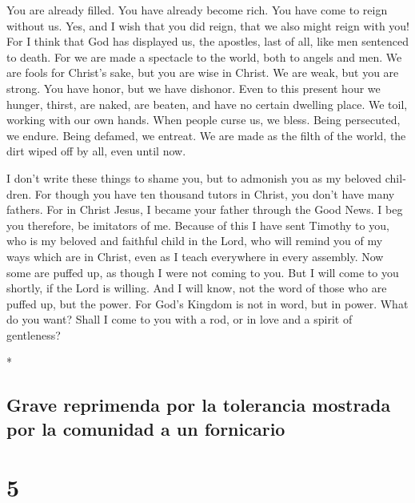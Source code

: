 \begin{paracol}{2}
\begin{otherlanguage}{english}
 You are already filled. You have already become rich. You
have come to reign without us. Yes, and I wish that you did reign, that
we also might reign with you!  For I think that God has
displayed us, the apostles, last of all, like men sentenced to death.
For we are made a spectacle to the world, both to angels and men.
 We are fools for Christ's sake, but you are wise in
Christ. We are weak, but you are strong. You have honor, but we have
dishonor.  Even to this present hour we hunger, thirst,
are naked, are beaten, and have no certain dwelling place.
 We toil, working with our own hands. When people curse
us, we bless. Being persecuted, we endure.  Being
defamed, we entreat. We are made as the filth of the world, the dirt
wiped off by all, even until now.

 I don't write these things to shame you, but to admonish
you as my beloved children.  For though you have ten
thousand tutors in Christ, you don't have many fathers. For in Christ
Jesus, I became your father through the Good News.  I beg
you therefore, be imitators of me.  Because of this I
have sent Timothy to you, who is my beloved and faithful child in the
Lord, who will remind you of my ways which are in Christ, even as I
teach everywhere in every assembly.  Now some are puffed
up, as though I were not coming to you.  But I will come
to you shortly, if the Lord is willing. And I will know, not the word of
those who are puffed up, but the power.  For God's
Kingdom is not in word, but in power.  What do you want?
Shall I come to you with a rod, or in love and a spirit of gentleness?

\end{otherlanguage}

\switchcolumn[0]*

\hypertarget{grave-reprimenda-por-la-tolerancia-mostrada-por-la-comunidad-a-un-fornicario}{%
\subsection{Grave reprimenda por la tolerancia mostrada por la comunidad
a un
fornicario}\label{grave-reprimenda-por-la-tolerancia-mostrada-por-la-comunidad-a-un-fornicario}}

\hypertarget{section-8}{%
\section{5}\label{section-8}}


\end{paracol}
